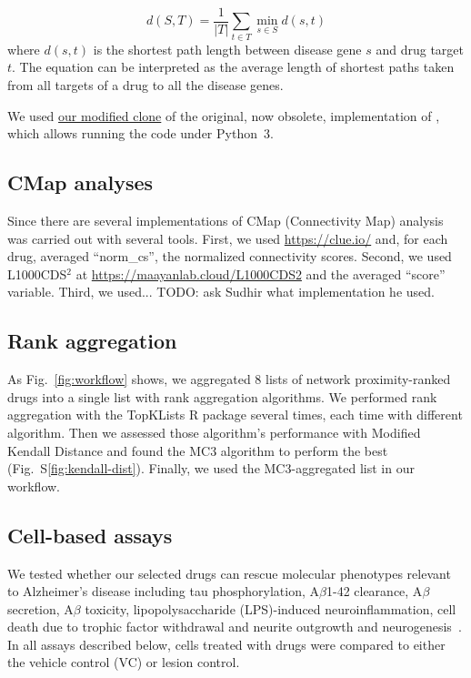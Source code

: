 \documentclass[letterpaper]{article}
\begin{document}
\begin{equation}
  d(S, T) = \frac{1}{|T|}\sum_{t \in T} \min_{s \in S} d(s, t)
\end{equation}
where $d(s,t)$ is the shortest path length between disease gene $s$ and drug
target $t$.  The equation can be interpreted as the average length of shortest
paths taken from all targets of a drug to all the disease genes.

We used \href{https://github.com/attilagk/guney_code}{our modified clone} of
the original, now obsolete, implementation of \cite{Guney2016}, which allows
running the code under Python~3.

\subsection{CMap analyses}

Since there are several implementations of CMap (Connectivity Map) analysis was carried out with several tools.  First, we used
\url{https://clue.io/} \citep{Lamb2006} and, for each drug, averaged
``norm\_cs'',
the normalized connectivity scores.  Second, we used L1000CDS$^2$ at
\url{https://maayanlab.cloud/L1000CDS2} and the averaged ``score'' variable.
Third, we used... TODO: ask Sudhir what implementation he used.

\subsection{Rank aggregation}

As Fig.~\ref{fig:workflow} shows, we aggregated 8 lists of network
proximity-ranked drugs into a single list with rank aggregation algorithms.
We performed rank aggregation with the TopKLists R package
several times, each time with different algorithm.  Then we assessed those
algorithm's performance with Modified Kendall Distance and found the MC3
algorithm to perform the best (Fig.~S\ref{fig:kendall-dist}).  Finally, we
used the MC3-aggregated list in our workflow.

\subsection{Cell-based assays}

We tested whether our selected drugs can rescue molecular phenotypes relevant
to Alzheimer's disease including tau phosphorylation, A$\beta$1-42 clearance,
A$\beta$ secretion, A$\beta$ toxicity, lipopolysaccharide (LPS)-induced
neuroinflammation, cell death due to trophic factor withdrawal and neurite
outgrowth and neurogenesis~\citep{Varma2020,Desai2022a}. In all assays
described below, cells treated with drugs were compared to either the vehicle
control (VC) or lesion control.
\end{document}
